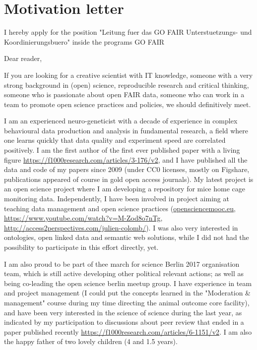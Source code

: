 \section* {Motivation letter}

I hereby apply for the position "Leitung fuer das GO FAIR Unterstuetzungs- und Koordinierungsbuero" inside the programs GO FAIR
\vspace {0.5cm} 

Dear reader,

If you are looking for a creative scientist with IT knowledge, someone with a very strong background in (open) science, reproducible research and critical thinking, someone who is passionate about open FAIR data, someone who can work in a team to promote open science practices and policies, we should definitively meet.

I am an experienced neuro-geneticist with a decade of experience in complex behavioural data production and analysis in fundamental research, a field where one learns quickly that data quality and experiment speed are correlated positively. I am the first author of the first ever published paper with a living figure \url{https://f1000research.com/articles/3-176/v2}, and I have published all the data and code of my papers since 2009 (under CC0 licenses, mostly on Figshare, publications appeared of course in gold open access journals). My latest project is an open science project where I am developing a repository for mice home cage monitoring data. Independently, I have been involved in project aiming at teaching data management and open science practices (\url{opensciencemooc.eu}, \url{https://www.youtube.com/watch?v=M-Zod8o7nTg}, \url{http://access2perspectives.com/julien-colomb/}). I was also very interested in ontologies, open linked data and semantic web solutions, while I did not had the possibility to participate in this effort directly, yet.

 I am also proud to be part of thee march for science Berlin 2017 organisation team, which is still active developing other political relevant actions; as well as being co-leading the open science berlin meetup group.
I  have experience in team and project management (I could put the concepts learned in the "Moderation \& management" course during my time directing the animal outcome core facility), and have been very interested in the science of science during the last year, as indicated by my participation to discussions about peer review that ended in a paper published recently \url{https://f1000research.com/articles/6-1151/v2}. 
 I am also the happy father of two lovely children (4 and 1.5 years).

